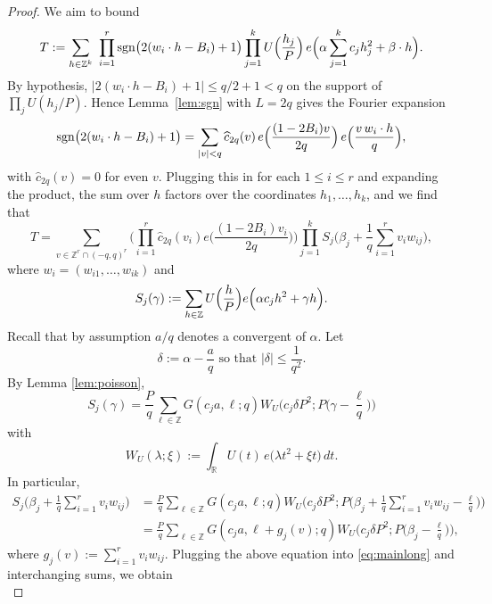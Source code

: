\documentclass[a4paper,reqno,12pt]{amsart}
\theoremstyle{plain}
\theoremstyle{plain}
\theoremstyle{remark}
\theoremstyle{plain}
\newcommand{\Z}{\mathbb{Z}}
\theoremstyle{plain}
\theoremstyle{plain}
\begin{document}
{\begin{proof}
We aim to bound
\[
T:=\sum_{h\in\Z^k}\ \prod_{i=1}^r\operatorname{sgn}\bigl(2(w_i\cdot h-B_i)+1\bigr)
\prod_{j=1}^kU\Bigl(\frac{h_j}P\Bigr)\,
e\Bigl(\alpha\sum_{j=1}^k c_j h_j^2+\beta\cdot h\Bigr).
\]
By hypothesis, $|2(w_i\cdot h-B_i)+1|\le q/2+1<q$ on the support of
$\prod_jU(h_j/P)$. Hence Lemma~\ref{lem:sgn} with $L=2q$ gives the
Fourier expansion
\[
\operatorname{sgn}\bigl(2(w_i\cdot h-B_i)+1\bigr)
=\sum_{\substack{|v| < q}}\widehat c_{2q}(v)\,
e\Bigl(\frac{(1-2B_i)v}{2q}\Bigr)\,
e\Bigl(\frac{v\,w_i\cdot h}q\Bigr),
\]
with $\widehat{c}_{2q}(v) = 0$ for even $v$.
Plugging this in for each $1\le i\le r$ and expanding the product, the
sum over $h$ factors over the coordinates $h_1,{\ldots},h_k$, and we find that
\begin{equation} \label{eq:mainlong}
T=\sum_{v \in \mathbb{Z}^r \cap (-q,q)^{r}}\Big (\prod_{i=1}^r\widehat c_{2q}(v_i) e \Big ( \frac{(1 - 2B_i) v_i}{2q} \Big )\Big )
\prod_{j=1}^k S_j \Big ( \beta_j + \frac{1}{q} \sum_{i = 1}^{r} v_i w_{ij}  \Big ),
\end{equation}
where $w_{i} = (w_{i1}, \ldots, w_{ik})$ and
$$
S_j(\gamma):=\sum_{h\in\Z}U\Big (\frac hP\Big )
e\Bigl(\alpha c_jh^2+\gamma h\Bigr).
$$
Recall that by assumption $a/q$ denotes a convergent of $\alpha$.
Let 
$$
\delta := \alpha - \frac{a}{q} \text{ so that } |\delta| \leq \frac{1}{q^2}. 
$$
By Lemma \ref{lem:poisson}, 
\begin{equation} \label{eq:poissonapplied}
S_j(\gamma) = \frac{P}{q} \sum_{\ell \in \mathbb{Z}} G(c_j a, \ell; q) W_U \Big ( c_j \delta P^2 ; P \Big ( \gamma - \frac{\ell}{q} \Big ) \Big )
\end{equation}
with 
$$
W_U(\lambda;\xi) := \int_{\mathbb{R}} U(t)\, e\big(\lambda t^2 + \xi t\big)\, dt.
$$
In particular, 
\begin{align*}
S_j \Big (\beta_j + \frac{1}{q} \sum_{i = 1}^{r} v_i w_{i j} \Big ) & = \frac{P}{q} \sum_{\ell \in \mathbb{Z}} G(c_j a, \ell ; q) W_U \Big ( c_j \delta P^2; P \Big ( \beta_j + \frac{1}{q} \sum_{i = 1}^{r} v_i w_{i j} - \frac{\ell}{q} \Big ) \Big ) \\ & = \frac{P}{q} \sum_{\ell \in \mathbb{Z}} G(c_j a, \ell + g_j(v); q) W_U \Big ( c_j \delta P^2; P \Big ( \beta_j - \frac{\ell}{q} \Big ) \Big ),
\end{align*}
where $g_j(v) := \sum_{i = 1}^{r} v_i w_{i j}$.
Plugging the above equation into \eqref{eq:mainlong} and interchanging sums{, we obtain} 
\begin{equation} \label{eq:exactformula}

\end{equation}
\end{proof}}
\end{document}
